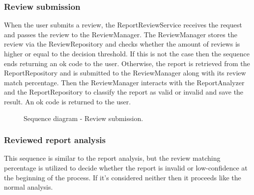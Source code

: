 \subsubsection{Review submission}
When the user submits a review, the ReportReviewService receives the request and passes the review to the ReviewManager. The ReviewManager stores the review via the ReviewRepository and checks whether the amount of reviews is higher or equal to the decision threshold. If this is not the case then the sequence ends returning an ok code to the user. Otherwise, the report is retrieved from the ReportRepository and is submitted to the ReviewManager along with its review match percentage. Then the ReviewManager interacts with the ReportAnalyzer and the ReportRepository to classify the report as valid or invalid and save the result. An ok code is returned to the user.

\begin{figure}[H]
    \centering
    \caption{\label{fig:sequence-review-submission}Sequence diagram - Review submission.}
\end{figure}

\subsubsection{Reviewed report analysis}
This sequence is similar to the report analysis, but the review matching percentage is utilized to decide whether the report is invalid or low-confidence at the beginning of the process. If it's considered neither then it proceeds like the normal analysis.

